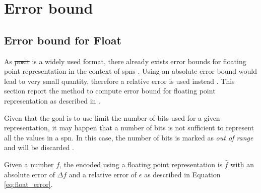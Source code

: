 
\chapter{Error bound}
\label{cha:eb}

\section{Error bound for Float}
As \sout{posit}  is a widely used format, there already exists error bounds for floating point representation in the context of \glspl{spn} \cite{errorbound_float}. Using an absolute error bound would lead to very small quantity, therefore a relative error is used instead . This section report the method to compute error bound for floating point representation as described in \cite{errorbound_float}.


\noindent {} Given that the goal is to use limit the number of bits used for a given representation, it may happen that a number of bits is not sufficient to represent all the values in a \gls{spn}. In this case, the number of bits is marked as \textit{out of range} and will be discarded . 

\smallbreak

Given a number $f$, the encoded using a floating point representation is $\hat{f}$ with an absolute error of $\Delta f$ and a relative error of $\epsilon$ as described in Equation \ref{eq:float_error}.

